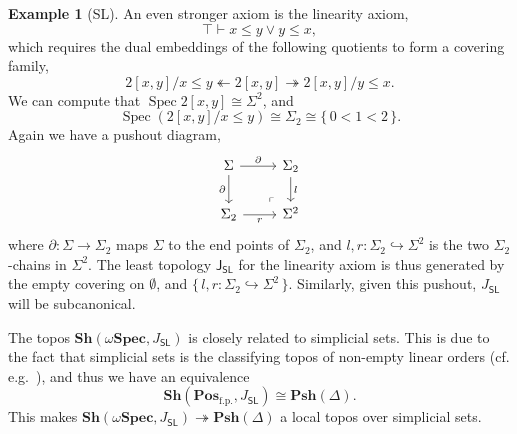 \documentclass[12pt]{amsart}
\theoremstyle{definition}
\newtheorem{example}[theorem]{Example}
\newcommand{\mb}[1]{\mathbf{#1}}
\newcommand{\mr}[1]{\mathrm{#1}}
\newcommand{\ms}[1]{\mathsf{#1}}
\newcommand{\Pos}{\mb{Pos}}
\newcommand{\sh}{\mb{Sh}}
\newcommand{\psh}{\mb{Psh}}
\newcommand{\set}[1]{\{\,#1\,\}}
\newcommand{\surj}{\twoheadrightarrow}
\newcommand{\hook}{\hookrightarrow}
\newcommand{\fp}{_{\mr{f.p.}}}
\newcommand{\emp}{\emptyset}
\newcommand{\wSpec}{\omega\mb{Spec}}
\newcommand{\spec}{\operatorname{Spec}}
\begin{document}
\begin{example}[SL]
  An even stronger axiom is the linearity axiom, 
  \[ \top \vdash x \le y \vee y \le x, \]
  which requires the dual embeddings of the following quotients to form a covering family,
  \[ 2[x,y]/x \le y \twoheadleftarrow 2[x,y] \surj 2[x,y]/y \le x. \]
  We can compute that $\spec 2[x,y] \cong \Sigma^2$, and 
  \[ \spec(2[x,y]/x \le y) \cong \Sigma_2 \cong \set{0 < 1 < 2}. \]
  Again we have a pushout diagram,
  \[
  \begin{tikzcd}
    \Sigma \ar[r, "\partial"] \ar[d, "\partial"'] & \Sigma_2 \ar[d, "l"] \\ 
    \Sigma_2 \ar[r, "r"'] & \Sigma^2
    \arrow["\lrcorner"{anchor=center, pos=0.125, rotate=180}, draw=none, from=2-2, to=1-1]
  \end{tikzcd}
  \]
  where $\partial : \Sigma \to \Sigma_2$ maps $\Sigma$ to the end points of $\Sigma_2$, and $l,r : \Sigma_2 \hook \Sigma^2$ is the two $\Sigma_2$-chains in $\Sigma^2$. The least topology $\ms J_{\ms{SL}}$ for the linearity axiom is thus generated by the empty covering on $\emp$, and $\set{l,r : \Sigma_2 \hook \Sigma^2}$. Similarly, given this pushout, $J_{\ms{SL}}$ will be subcanonical.

  The topos $\sh(\wSpec,J_{\ms{SL}})$ is closely related to simplicial sets. This is due to the fact that simplicial sets is the classifying topos of non-empty linear orders (cf. e.g.~\cite[VIII. 8]{maclane2012sheaves}), and thus we have an equivalence 
  \[ \sh(\Pos\fp,J_{\ms{SL}}) \cong \psh(\Delta). \]
  This makes $\sh(\wSpec,J_{\ms{SL}}) \surj \psh(\Delta)$ a local topos over simplicial sets.
\end{example}
\end{document}
